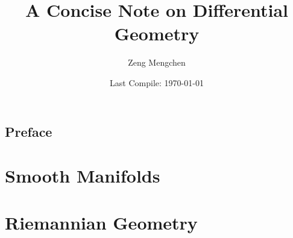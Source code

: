 \documentclass[]{book}
\title{A Concise Note on Differential Geometry}
\author{Zeng Mengchen}
\date{Last Compile: \today}
\theoremstyle{definition}
\theoremstyle{plain}
\theoremstyle{remark}
\begin{document}
\maketitle

\frontmatter

\tableofcontents
\chapter{Preface}

\mainmatter

\part{Smooth Manifolds}

\part{Riemannian Geometry}



\backmatter


\end{document}
